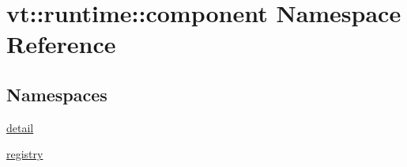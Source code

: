 \hypertarget{namespacevt_1_1runtime_1_1component}{}\section{vt\+:\+:runtime\+:\+:component Namespace Reference}
\label{namespacevt_1_1runtime_1_1component}
\subsection*{Namespaces}
\begin{DoxyCompactItemize}
\item 
 \hyperlink{namespacevt_1_1runtime_1_1component_1_1detail}{detail}
\item 
 \hyperlink{namespacevt_1_1runtime_1_1component_1_1registry}{registry}
\end{DoxyCompactItemize}
